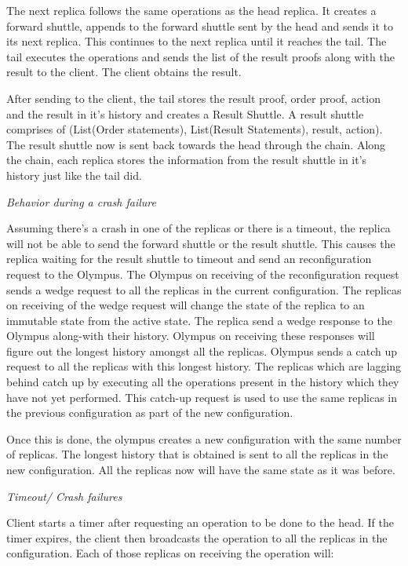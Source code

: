 \documentclass[letterpaper, 10 pt, conference]{ieeeconf}  %
\begin{document}
The next replica follows the same operations as the head replica. It creates a forward shuttle, appends to the forward shuttle sent by the head and sends it to its next replica. This continues to the next replica until it reaches the tail. The tail executes the operations and sends the list of the result proofs along with the result to the client. The client obtains the result.

After sending to the client, the tail stores the result proof, order proof, action and the result in it's history and creates a Result Shuttle. A result shuttle comprises of (List(Order statements), List(Result Statements), result, action). The result shuttle now is sent back towards the head through the chain. Along the chain, each replica stores the information from the result shuttle in it's history just like the tail did.

\textit{Behavior during a crash failure}

Assuming there's a crash in one of the replicas or there is a timeout, the replica will not be able to send the forward shuttle or the result shuttle. This causes the replica waiting for the result shuttle to timeout and send an reconfiguration request to the Olympus. The Olympus on receiving of the reconfiguration request sends a wedge request to all the replicas in the current configuration. The replicas on receiving of the wedge request will change the state of the replica to an immutable state from the active state. The replica send a wedge response to the Olympus along-with their history. Olympus on receiving these responses will figure out the longest history amongst all the replicas. Olympus sends a catch up request to all the replicas with this longest history. The replicas which are lagging behind catch up by executing all the operations present in the history which they have not yet performed. This catch-up request is used to use the same replicas in the previous configuration as part of the new configuration.

Once this is done, the olympus creates a new configuration with the same number of replicas. The longest history that is obtained is sent to all the replicas in the new configuration. All the replicas now will have the same state as it was before.

\textit{Timeout/ Crash failures}

Client starts a timer after requesting an operation to be done to the head. If the timer expires, the client then broadcasts the operation to all the replicas in the configuration. Each of those replicas on receiving the operation will:
\end{document}
